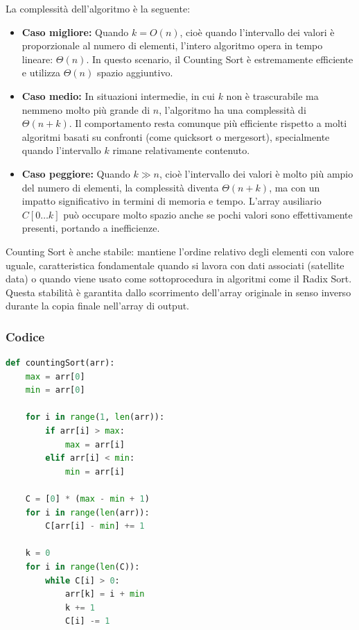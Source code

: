 \documentclass[a4paper, 11pt]{article}
\begin{document}
\noindent La complessità dell’algoritmo è la seguente:

\begin{itemize}
  \item \textbf{Caso migliore:} Quando \(k = O(n)\), cioè quando l’intervallo dei valori è proporzionale al numero di elementi, l’intero algoritmo opera in tempo lineare: \(\Theta(n)\). In questo scenario, il Counting Sort è estremamente efficiente e utilizza \(\Theta(n)\) spazio aggiuntivo.
  
  \item \textbf{Caso medio:} In situazioni intermedie, in cui \(k\) non è trascurabile ma nemmeno molto più grande di \(n\), l'algoritmo ha una complessità di \(\Theta(n + k)\). Il comportamento resta comunque più efficiente rispetto a molti algoritmi basati su confronti (come quicksort o mergesort), specialmente quando l’intervallo \(k\) rimane relativamente contenuto.

  \item \textbf{Caso peggiore:} Quando \(k \gg n\), cioè l’intervallo dei valori è molto più ampio del numero di elementi, la complessità diventa \(\Theta(n + k)\), ma con un impatto significativo in termini di memoria e tempo. L’array ausiliario \(C[0 \dots k]\) può occupare molto spazio anche se pochi valori sono effettivamente presenti, portando a inefficienze.

\end{itemize}

\noindent Counting Sort è anche stabile: mantiene l’ordine relativo degli elementi con valore uguale, caratteristica fondamentale quando si lavora con dati associati (satellite data) o quando viene usato come sottoprocedura in algoritmi come il Radix Sort. \\
Questa stabilità è garantita dallo scorrimento dell’array originale in senso inverso durante la copia finale nell’array di output.

\subsubsection*{Codice}
\begin{lstlisting}[style=mycodestyle, language=Python]
    def countingSort(arr):
    max = arr[0]
    min = arr[0]

    for i in range(1, len(arr)):
        if arr[i] > max:
            max = arr[i]
        elif arr[i] < min:
            min = arr[i]

    C = [0] * (max - min + 1)
    for i in range(len(arr)):
        C[arr[i] - min] += 1

    k = 0
    for i in range(len(C)):
        while C[i] > 0:
            arr[k] = i + min
            k += 1
            C[i] -= 1
\end{lstlisting}
\end{document}
